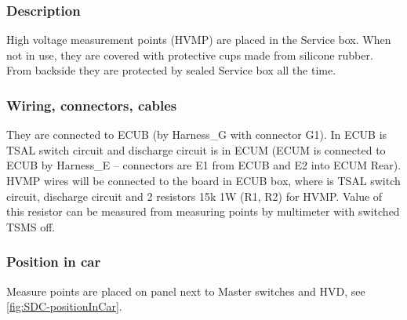 \subsubsection{Description}

High voltage measurement points (HVMP) are placed in the Service box. When not in use, they are covered with protective cups made from silicone rubber. From backside they are protected by sealed Service box all the time.
\subsubsection{Wiring, connectors, cables}

They are connected to ECUB (by Harness\_G with connector G1). In ECUB is TSAL switch circuit and discharge circuit is in ECUM (ECUM is connected to ECUB by Harness\_E – connectors are E1 from ECUB and E2 into ECUM Rear).
HVMP wires will be connected to the board in ECUB box, where is TSAL switch circuit, discharge circuit and 2 resistors 15k 1W (R1, R2) for HVMP. Value of this resistor can be measured from measuring points by multimeter with switched TSMS off.

\subsubsection{Position in car}

Measure points are placed on panel next to Master switches and HVD, see \ref{fig:SDC-positionInCar}.